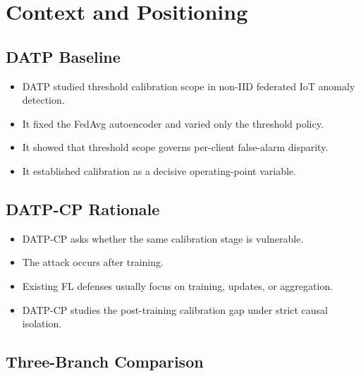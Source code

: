 
\section{Context and Positioning}

\subsection{DATP Baseline}

\begin{itemize}
  \item DATP studied threshold calibration scope in non-IID federated IoT anomaly detection.
  \item It fixed the FedAvg autoencoder and varied only the threshold policy.
  \item It showed that threshold scope governs per-client false-alarm disparity.
  \item It established calibration as a decisive operating-point variable.
\end{itemize}

\subsection{DATP-CP Rationale}

\begin{itemize}
  \item DATP-CP asks whether the same calibration stage is vulnerable.
  \item The attack occurs after training.
  \item Existing FL defenses usually focus on training, updates, or aggregation.
  \item DATP-CP studies the post-training calibration gap under strict causal isolation.
\end{itemize}

\subsection{Three-Branch Comparison}


